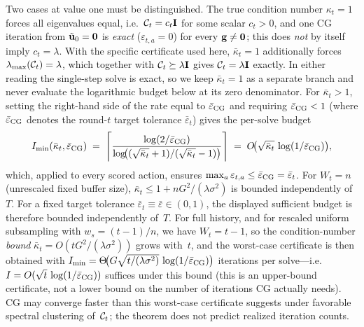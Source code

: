 Two cases at value one must be distinguished.  The true condition number
$\kappa_t=1$ forces all eigenvalues equal, i.e.\ $\mathcal{C}_t=c_t\mathbf{I}$ for some
scalar $c_t>0$, and one CG iteration from $\tilde{\mathbf{u}}_0=\mathbf0$ is \emph{exact}
($\varepsilon_{t,a}=0$) for every $\mathbf{g}\ne\mathbf0$; this does \emph{not} by itself
imply $c_t=\lambda$.  With the specific certificate used here,
$\bar\kappa_t=1$
additionally forces $\lambda_{\max}(\mathcal{C}_t)=\lambda$, which together with
$\mathcal{C}_t\succeq\lambda\mathbf{I}$ gives $\mathcal{C}_t=\lambda\mathbf{I}$ exactly.  In either reading
the single-step solve is exact, so we keep $\bar\kappa_t=1$ as a separate branch and
never evaluate the logarithmic budget below at its zero denominator.  For
$\bar\kappa_t>1$, setting the
right-hand side of the rate equal to $\bar\varepsilon_{\mathrm{CG}}$ and requiring
$\bar\varepsilon_{\mathrm{CG}} < 1$ (where $\bar\varepsilon_{\mathrm{CG}}$ denotes the round-$t$ target tolerance
$\bar\varepsilon_t$) gives the per-solve budget
\begin{equation}\label{eq:cg-budget}
  I_{\min}(\bar\kappa_t,\bar\varepsilon_{\mathrm{CG}})
  \;=\;
  \left\lceil\frac{\log(2/\bar\varepsilon_{\mathrm{CG}})}
  {\log\!\bigl((\sqrt{\bar\kappa_t}+1)/(\sqrt{\bar\kappa_t}-1)\bigr)}
  \right\rceil
  \;=\; O\!\bigl(\sqrt{\bar\kappa_t}\,\log(1/\bar\varepsilon_{\mathrm{CG}})\bigr),
\end{equation}
which, applied to every scored action, ensures
$\max_a\varepsilon_{t,a}\le\bar\varepsilon_{\mathrm{CG}}=\bar\varepsilon_t$.
For $W_t=n$ (unrescaled fixed buffer size),
$\bar\kappa_t\le 1+nG^2/(\lambda\sigma^2)$ is bounded independently of~$T$.
For a fixed target tolerance $\bar\varepsilon_t\equiv\bar\varepsilon\in(0,1)$,
the displayed sufficient budget is therefore bounded independently of~$T$.
For full history, and for rescaled uniform subsampling with
$w_s=(t{-}1)/n$, we have $W_t=t{-}1$, so the condition-number \emph{bound}
$\bar\kappa_t=O(tG^2/(\lambda\sigma^2))$ grows with~$t$, and the worst-case
certificate is then obtained with
$I_{\min}=\Theta\!\bigl(G\sqrt{t/(\lambda\sigma^2)}\,\log(1/\bar\varepsilon_{\mathrm{CG}})\bigr)$
iterations per solve---i.e.\ $I=O(\sqrt{t}\,\log(1/\bar\varepsilon_{\mathrm{CG}}))$ suffices under this
bound (this is an upper-bound certificate, not a lower bound on the number of
iterations CG actually needs).
CG may converge faster than this worst-case certificate suggests under favorable
spectral clustering of~$\mathcal{C}_t$; the theorem does not predict realized iteration
counts.
